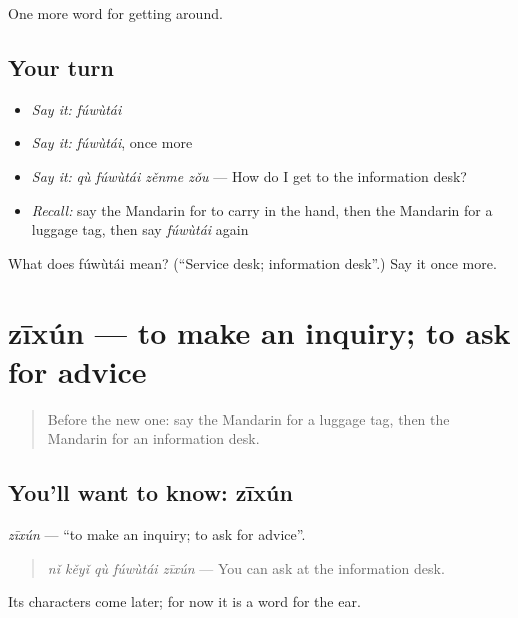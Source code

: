\begin{grammarlens}[title={What you've built}]
One more word for getting around.
\end{grammarlens}

\subsection*{Your turn}
\begin{itemize}
\raggedright
  \item \emph{Say it:} \emph{fúwùtái}
  \item \emph{Say it:} \emph{fúwùtái}, once more
  \item \emph{Say it:} \emph{qù fúwùtái zěnme zǒu} — How do I get to the information desk?
  \item \emph{Recall:} say the Mandarin for to carry in the hand, then the Mandarin for a luggage tag, then say \emph{fúwùtái} again
\end{itemize}

\begin{tcolorbox}[breakable,colback=teal!4,colframe=teal!35!black,title={Before you move on}]
What does fúwùtái mean? (\textquotedblleft{}Service desk; information desk\textquotedblright{}.) Say it once more.
\end{tcolorbox}
\section[zīxún]{zīxún — to make an inquiry; to ask for advice}

\label{lesson:ZH-C454-zixun}



\begin{quote}
Before the new one: say the Mandarin for a luggage tag, then the Mandarin for an information desk.
\end{quote}

\subsection*{You'll want to know: zīxún}
\emph{zīxún} — \textquotedblleft{}to make an inquiry; to ask for advice\textquotedblright{}.

\begin{quote}
\emph{nǐ kěyǐ qù fúwùtái zīxún} — You can ask at the information desk.
\end{quote}

Its characters come later; for now it is a word for the ear.

